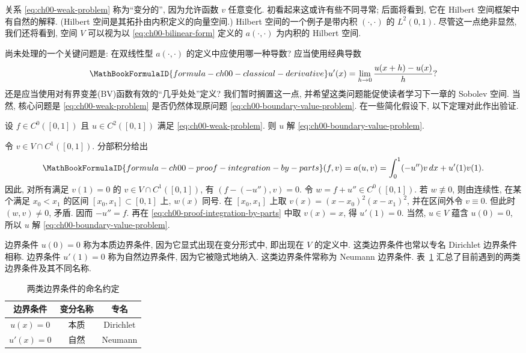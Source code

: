 关系 \eqref{eq:ch00-weak-problem} 称为``变分的'', 因为允许函数 $v$ 任意变化. 初看起来这或许有些不同寻常; 后面将看到, 它在 Hilbert 空间框架中有自然的解释. (Hilbert 空间是其拓扑由内积定义的向量空间.) Hilbert 空间的一个例子是带内积 $(\cdot,\cdot)$ 的 $L^2(0,1)$. 尽管这一点绝非显然, 我们还将看到, 空间 $V$ 可以视为以 \eqref{eq:ch00-bilinear-form} 定义的 $a(\cdot,\cdot)$ 为内积的 Hilbert 空间.

尚未处理的一个关键问题是: 在双线性型 $a(\cdot,\cdot)$ 的定义中应使用哪一种导数? 应当使用经典导数
\[
\MathBookFormulaID{formula-ch00-classical-derivative}
u'(x)=\lim_{h\to0}\frac{u(x+h)-u(x)}{h}?
\]
还是应当使用对有界变差(BV)函数有效的``几乎处处''定义? 我们暂时搁置这一点, 并希望这类问题能促使读者学习下一章的 Sobolev 空间. 当然, 核心问题是 \eqref{eq:ch00-weak-problem} 是否仍然体现原问题 \eqref{eq:ch00-boundary-value-problem}. 在一些简化假设下, 以下定理对此作出验证.

\setcounter{thmcount}{3}
\begin{Theorem}
\label{thm:ch00-classical-solution-from-weak-form}
设 $f\in C^0([0,1])$ 且 $u\in C^2([0,1])$ 满足 \eqref{eq:ch00-weak-problem}. 则 $u$ 解 \eqref{eq:ch00-boundary-value-problem}.
\end{Theorem}

\begin{Proof}
令 $v\in V\cap C^1([0,1])$. 分部积分给出
\setcounter{equation}{4}
\begin{equation}
\MathBookFormulaID{formula-ch00-proof-integration-by-parts}
(f,v)=a(u,v)=\int_0^1(-u'')v\,dx+u'(1)v(1).
\label{eq:ch00-proof-integration-by-parts}
\end{equation}
因此, 对所有满足 $v(1)=0$ 的 $v\in V\cap C^1([0,1])$, 有 $(f-(-u''),v)=0$. 令 $w=f+u''\in C^0([0,1])$. 若 $w\not\equiv0$, 则由连续性, 在某个满足 $x_0<x_1$ 的区间 $[x_0,x_1]\subset[0,1]$ 上, $w(x)$ 同号. 在 $[x_0,x_1]$ 上取 $v(x)=(x-x_0)^2(x-x_1)^2$, 并在区间外令 $v\equiv0$. 但此时 $(w,v)\neq0$, 矛盾. 因而 $-u''=f$. 再在 \eqref{eq:ch00-proof-integration-by-parts} 中取 $v(x)=x$, 得 $u'(1)=0$. 当然, $u\in V$ 蕴含 $u(0)=0$, 所以 $u$ 解 \eqref{eq:ch00-boundary-value-problem}.
\end{Proof}

\setcounter{thmcount}{5}
\begin{Remark}
\label{rem:ch00-boundary-condition-names}
边界条件 $u(0)=0$ 称为本质边界条件, 因为它显式出现在变分形式中, 即出现在 $V$ 的定义中. 这类边界条件也常以专名 Dirichlet 边界条件相称. 边界条件 $u'(1)=0$ 称为自然边界条件, 因为它被隐式地纳入. 这类边界条件常称为 Neumann 边界条件. 表~\ref{tab:ch00-boundary-condition-names} 汇总了目前遇到的两类边界条件及其不同名称.
\end{Remark}
\begin{table}[H]
\centering
\caption{两类边界条件的命名约定}
\label{tab:ch00-boundary-condition-names}
\begin{tabular}{ccc}
\hline
边界条件 & 变分名称 & 专名\\
\hline
$u(x)=0$ & 本质 & Dirichlet\\
$u'(x)=0$ & 自然 & Neumann\\
\hline
\end{tabular}
\end{table}

